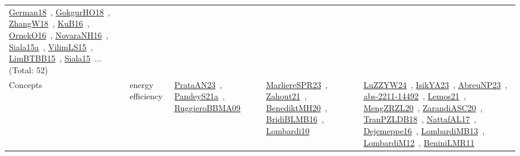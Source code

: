 {\begin{longtable}{lp{3cm}>{\raggedright\arraybackslash}p{6cm}>{\raggedright\arraybackslash}p{6cm}>{\raggedright\arraybackslash}p{8cm}}
\href{../works/German18.pdf}{German18}~\cite{German18}, \href{../works/GokgurHO18.pdf}{GokgurHO18}~\cite{GokgurHO18}, \href{../works/ZhangW18.pdf}{ZhangW18}~\cite{ZhangW18}, \href{../works/KuB16.pdf}{KuB16}~\cite{KuB16}, \href{../works/OrnekO16.pdf}{OrnekO16}~\cite{OrnekO16}, \href{../works/NovaraNH16.pdf}{NovaraNH16}~\cite{NovaraNH16}, \href{../works/Siala15a.pdf}{Siala15a}~\cite{Siala15a}, \href{../works/VilimLS15.pdf}{VilimLS15}~\cite{VilimLS15}, \href{../works/LimBTBB15.pdf}{LimBTBB15}~\cite{LimBTBB15}, \href{../works/Siala15.pdf}{Siala15}~\cite{Siala15}... (Total: 52)\\
Concepts & energy efficiency & \href{../works/PrataAN23.pdf}{PrataAN23}~\cite{PrataAN23}, \href{../works/PandeyS21a.pdf}{PandeyS21a}~\cite{PandeyS21a}, \href{../works/RuggieroBBMA09.pdf}{RuggieroBBMA09}~\cite{RuggieroBBMA09} & \href{../works/MarliereSPR23.pdf}{MarliereSPR23}~\cite{MarliereSPR23}, \href{../works/Zahout21.pdf}{Zahout21}~\cite{Zahout21}, \href{../works/BenediktMH20.pdf}{BenediktMH20}~\cite{BenediktMH20}, \href{../works/BridiBLMB16.pdf}{BridiBLMB16}~\cite{BridiBLMB16}, \href{../works/Lombardi10.pdf}{Lombardi10}~\cite{Lombardi10} & \href{../works/LuZZYW24.pdf}{LuZZYW24}~\cite{LuZZYW24}, \href{../works/IsikYA23.pdf}{IsikYA23}~\cite{IsikYA23}, \href{../works/AbreuNP23.pdf}{AbreuNP23}~\cite{AbreuNP23}, \href{../works/abs-2211-14492.pdf}{abs-2211-14492}~\cite{abs-2211-14492}, \href{../works/Lemos21.pdf}{Lemos21}~\cite{Lemos21}, \href{../works/MengZRZL20.pdf}{MengZRZL20}~\cite{MengZRZL20}, \href{../works/ZarandiASC20.pdf}{ZarandiASC20}~\cite{ZarandiASC20}, \href{../works/TranPZLDB18.pdf}{TranPZLDB18}~\cite{TranPZLDB18}, \href{../works/NattafAL17.pdf}{NattafAL17}~\cite{NattafAL17}, \href{../works/Dejemeppe16.pdf}{Dejemeppe16}~\cite{Dejemeppe16}, \href{../works/LombardiMB13.pdf}{LombardiMB13}~\cite{LombardiMB13}, \href{../works/LombardiM12.pdf}{LombardiM12}~\cite{LombardiM12}, \href{../works/BeniniLMR11.pdf}{BeniniLMR11}~\cite{BeniniLMR11}\\

\end{longtable}}
